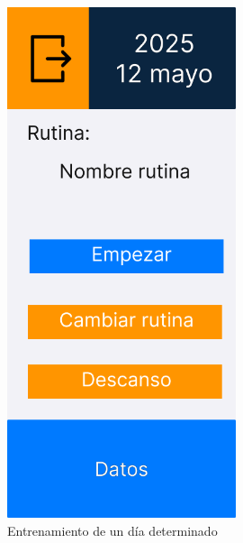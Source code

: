 \begin{figure}[H]
   \centering
    \includegraphics[width=0.6\textwidth]{fotos/Frame 26.png}
    \caption{Entrenamiento de un día determinado}
    \label{fig:Entrenamiento de un día determinado}
\end{figure}
